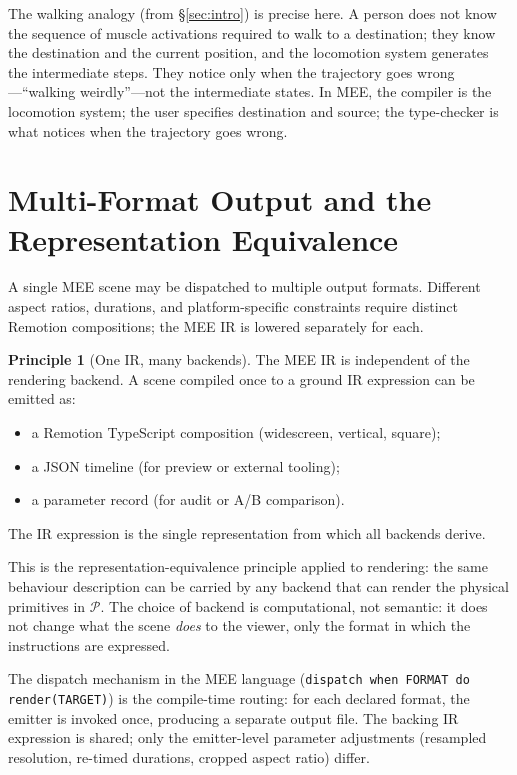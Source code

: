 \documentclass[twocolumn,11pt,a4paper]{article}
\theoremstyle{mee}
\theoremstyle{definition}
\newtheorem{principle}[theorem]{Principle}
\theoremstyle{remark}
\newcommand{\Phys}{\mathcal{P}}
\begin{document}
The walking analogy (from \S\ref{sec:intro}) is precise here. A person
does not know the sequence of muscle activations required to walk to a
destination; they know the destination and the current position, and the
locomotion system generates the intermediate steps. They notice only when
the trajectory goes wrong---``walking weirdly''---not the intermediate
states. In MEE, the compiler is the locomotion system; the user specifies
destination and source; the type-checker is what notices when the
trajectory goes wrong.

\section{Multi-Format Output and the Representation Equivalence}
\label{sec:format}

A single MEE scene may be dispatched to multiple output formats. Different
aspect ratios, durations, and platform-specific constraints require
distinct Remotion compositions; the MEE IR is lowered separately for each.

\begin{principle}[One IR, many backends]
\label{prin:backends}
The MEE IR is independent of the rendering backend. A scene compiled once
to a ground IR expression can be emitted as:
\begin{itemize}[leftmargin=1.4em,itemsep=1pt]
\item a Remotion TypeScript composition (widescreen, vertical, square);
\item a JSON timeline (for preview or external tooling);
\item a parameter record (for audit or A/B comparison).
\end{itemize}
The IR expression is the single representation from which all backends
derive.
\end{principle}

This is the representation-equivalence principle applied to rendering:
the same behaviour description can be carried by any backend that can
render the physical primitives in $\Phys$. The choice of backend is
computational, not semantic: it does not change what the scene \emph{does}
to the viewer, only the format in which the instructions are expressed.

The dispatch mechanism in the MEE language (\texttt{dispatch when FORMAT
do render(TARGET)}) is the compile-time routing: for each declared format,
the emitter is invoked once, producing a separate output file. The
backing IR expression is shared; only the emitter-level parameter
adjustments (resampled resolution, re-timed durations, cropped aspect
ratio) differ.
\end{document}
